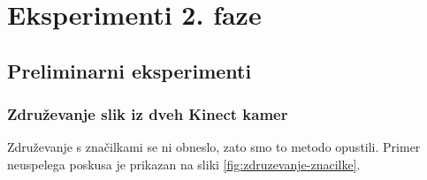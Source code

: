 \section{Eksperimenti 2. faze}










\subsection{Preliminarni eksperimenti}





\subsubsection{Združevanje slik iz dveh Kinect kamer}\label{sec:rezultati-zdruzevanje}
Združevanje s značilkami se ni obneslo, zato smo to metodo opustili. Primer neuspelega poskusa je prikazan na sliki \ref{fig:zdruzevanje-znacilke}.

